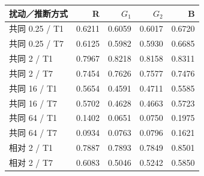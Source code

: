 \begin{inlinetable}
\centering
\caption{105,000 次适配迭代后的扰动响应增益。数值 0.25、2、16 与 64 表示源图像中位强度（DN），增益为无量纲量，相对增益采用时间中心化。}\label{tab:gains}
\footnotesize
\setlength{\tabcolsep}{4pt}
\begin{tabular}{lrrrr}
\toprule
扰动／推断方式 & R & $G_1$ & $G_2$ & B \\
\midrule
共同 0.25 / T1 & 0.6211 & 0.6059 & 0.6017 & 0.6720 \\
共同 0.25 / T7 & 0.6125 & 0.5982 & 0.5930 & 0.6685 \\
共同 2 / T1 & 0.7967 & 0.8218 & 0.8158 & 0.8311 \\
共同 2 / T7 & 0.7454 & 0.7626 & 0.7577 & 0.7476 \\
共同 16 / T1 & 0.5654 & 0.4591 & 0.4711 & 0.5585 \\
共同 16 / T7 & 0.5702 & 0.4628 & 0.4663 & 0.5723 \\
共同 64 / T1 & 0.1402 & 0.0651 & 0.0750 & 0.1975 \\
共同 64 / T7 & 0.0934 & 0.0763 & 0.0796 & 0.1621 \\
相对 2 / T1 & 0.7887 & 0.7893 & 0.7849 & 0.8501 \\
相对 2 / T7 & 0.6083 & 0.5046 & 0.5242 & 0.5850 \\
\bottomrule
\end{tabular}
\end{inlinetable}
